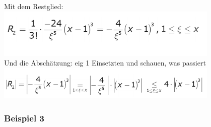 \documentclass[12pt,a4paper]{article}
\begin{document}
Mit dem Restglied:\\
\includegraphics[width=0.8\textwidth]{BIlder/V1/27.png}\\
Und die Abschätzung: eig 1 Einsetzten und schauen, was passiert\\
\includegraphics[width=0.8\textwidth]{BIlder/V1/28.png}\\
\subsubsection{Beispiel 3}
\end{document}
